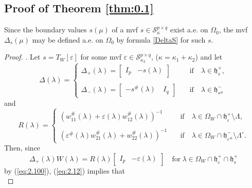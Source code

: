 \documentclass[12pt,twoside,a4paper]{amsart}
\theoremstyle{definition}
\numberwithin{equation}{section}
\begin{document}
\subsection{Proof of Theorem \ref{thm:0.1}}
Since the boundary values $s(\mu)$ of a mvf $s\in {\mathcal
S}^{p\times q}_\kappa$ exist a.e. on $\Omega_0$, the mvf $\Delta_s(\mu)$
may be defined a.e. on $\Omega_0$ by formula \eqref{DeltaS} for such
$s$.
\begin{proof}. Let $s=T_W[\varepsilon]$
for some mvf $\varepsilon\in {\mathcal S}^{p\times q}_{\kappa_2}$,
($\kappa=\kappa_1+\kappa_2$) and let
\begin{equation}
\label{eq:2.11} \Delta (\lambda)=\left\{
  \begin{array}{ll}
     \Delta_+({\lambda}) = \begin{bmatrix}I_{p} & -s(\lambda)\end{bmatrix} \quad
&\text{if}\quad {\lambda}\in \mathfrak{h}_s^+,\\ \\
     \Delta_-({\lambda})=\begin{bmatrix}-s^\#({\lambda})&\ I_q\end{bmatrix}\quad&
\text{if}\quad {\lambda} \in \mathfrak{h}_{s^{\#}}^-
  \end{array}\right.
\end{equation}
and
\begin{equation}\label{eq:2.13}
   R({\lambda})=\left\{\begin{array}{ll}(w^\#_{11}({\lambda})
   +\varepsilon({\lambda})w^\#_{12}({\lambda}))^{-1}\quad&\text{if}\quad
{\lambda}\in\Omega_W\cap{{\mathfrak h}}_\varepsilon^+\setminus\Lambda,\\ \\
(\varepsilon^\#({\lambda}) w^\#_{21}({\lambda})
    +w^\#_{22}({\lambda}))^{-1}\quad &\text{if}\quad {\lambda} \in
 \Omega_W\cap {{\mathfrak h}}_{\varepsilon^\#}^-\setminus\Lambda^\circ.
\end{array}\right.
\end{equation}
Then, since
\begin{equation}\label{eq:2.12}
\Delta_+({\lambda})W({\lambda})=  R({\lambda})\begin{bmatrix}I_{p} &
-\varepsilon(\lambda)\end{bmatrix}\quad\text{for}\ {\lambda} \in
\Omega_W\cap{{\mathfrak h}}_\varepsilon^+\cap{\mathfrak h}_s^+
\end{equation}
by (\ref{eq:2.100}), (\ref{eq:2.12}) implies that
\begin{equation}\label{eq:2.15}

\end{equation}
\end{proof}
\end{document}
